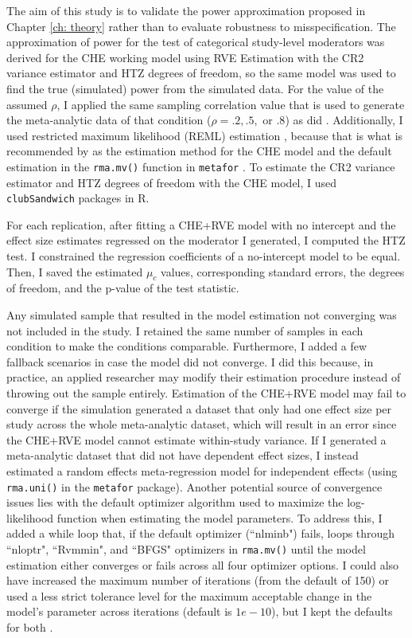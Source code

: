 The aim of this study is to validate the power approximation proposed in Chapter \ref{ch: theory} rather than to evaluate robustness to misspecification. The approximation of power for the test of categorical study-level moderators was derived for the CHE working model using RVE Estimation with the CR2 variance estimator and HTZ degrees of freedom, so the same model was used to find the true (simulated) power from the simulated data. For the value of the assumed $\rho$, I applied the same sampling correlation value that is used to generate the meta-analytic data of that condition ($\rho=.2, .5,$ or $.8$) as did \textcite{vembye2023}. Additionally, I used restricted maximum likelihood (REML) estimation \autocite{viechtbauer2015, viechtbauer2005}, because that is what is recommended by \textcite{pustejovsky2022} as the estimation method for the CHE model and the default estimation in the \texttt{rma.mv()} function in \texttt{metafor} \autocite{viechtbauer2010a}. To estimate the CR2 variance estimator and HTZ degrees of freedom with the CHE model, I used \texttt{clubSandwich} \textcite{pustejovsky2024a} packages in R.

For each replication, after fitting a CHE+RVE model with no intercept and the effect size estimates regressed on the moderator I generated, I computed the HTZ test. I constrained the regression coefficients of a no-intercept model to be equal. Then, I saved the estimated $\mu_c$ values, corresponding standard errors, the degrees of freedom, and the p-value of the test statistic. 

Any simulated sample that resulted in the model estimation not converging was not included in the study. I retained the same number of samples in each condition to make the conditions comparable. Furthermore, I added a few fallback scenarios in case the model did not converge. I did this because, in practice, an applied researcher may modify their estimation procedure instead of throwing out the sample entirely. Estimation of the CHE+RVE model may fail to converge if the simulation generated a dataset that only had one effect size per study across the whole meta-analytic dataset, which will result in an error since the CHE+RVE model cannot estimate within-study variance. If I generated a meta-analytic dataset that did not have dependent effect sizes, I instead estimated a random effects meta-regression model for independent effects (using \texttt{rma.uni()} in the \texttt{metafor} package). Another potential source of convergence issues lies with the default optimizer algorithm used to maximize the log-likelihood function when estimating the model parameters. To address this, I added a while loop that, if the default optimizer (``nlminb") fails, loops through ``nloptr", ``Rvmmin", and ``BFGS" optimizers in \texttt{rma.mv()} until the model estimation either converges or fails across all four optimizer options. I could also have increased the maximum number of iterations (from the default of 150) or used a less strict tolerance level for the maximum acceptable change in the model's parameter across iterations (default is $1e-10$), but I kept the defaults for both \autocite{viechtbauer_convergence_2022}. 

